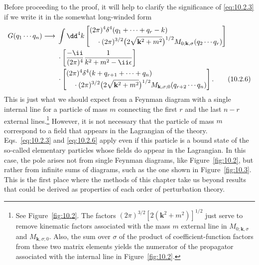 Before proceeding to the proof, it will help to clarify the significance of
\eqref{eq:10.2.3} if we write it in the somewhat long-winded form
\begin{align}
  G(q_1\cdots q_n)\longrightarrow{}&\int \dd^4k
  \left[\begin{aligned}
  &(2\pi)^4\delta^4(q_1+\cdots+q_r-k)\\[-2pt]
  &\quad{}\cdot(2\pi)^{3/2}
  \bigl(2\sqrt{\mathbf k^2+m^2}\bigr)^{1/2}
  M_{0;\mathbf k,\sigma}(q_2\cdots q_r)
  \end{aligned}\right]
  \notag\\
  &\cdot\left[\frac{-\ii}{(2\pi)^4}\frac{1}{k^2+m^2-\ii\epsilon}\right]
  \notag\\
  &\cdot\left[\begin{aligned}
  &(2\pi)^4\delta^4(k+q_{r+1}+\cdots+q_n)\\[-2pt]
  &\quad{}\cdot(2\pi)^{3/2}
  \bigl(2\sqrt{\mathbf k^2+m^2}\bigr)^{1/2}
  M_{\mathbf k,\sigma;0}(q_{r+2}\cdots q_n)
  \end{aligned}\right].
  \tag{10.2.6}\label{eq:10.2.6}
\end{align}
This is just what we should expect from a Feynman diagram with a single
internal line for a particle of mass $m$ connecting the first $r$ and the last
$n-r$ external lines.\footnote{See Figure~\ref{fig:10.2}. The factors
$(2\pi)^{3/2}[2(\mathbf k^2+m^2)]^{1/2}$ just serve to remove kinematic factors
associated with the mass $m$ external line in $M_{0;\mathbf k,\sigma}$ and
$M_{\mathbf k,\sigma;0}$. Also, the sum over $\sigma$ of the product of
coefficient-function factors from these two matrix elements yields the numerator of
the propagator associated with the internal line in Figure~\ref{fig:10.2}.} However, it is
not necessary that the particle of mass $m$ correspond to a field that appears
in the Lagrangian of the theory. Eqs.~\eqref{eq:10.2.3} and \eqref{eq:10.2.6} apply even if this
particle is a bound state of the so-called elementary particles whose fields
do appear in the Lagrangian. In this case, the pole arises not from single
Feynman diagrams, like Figure~\ref{fig:10.2}, but rather from infinite sums of diagrams,
such as the one shown in Figure~\ref{fig:10.3}. This is the first place where the methods
of this chapter take us beyond results that could be derived as properties of
each order of perturbation theory.

